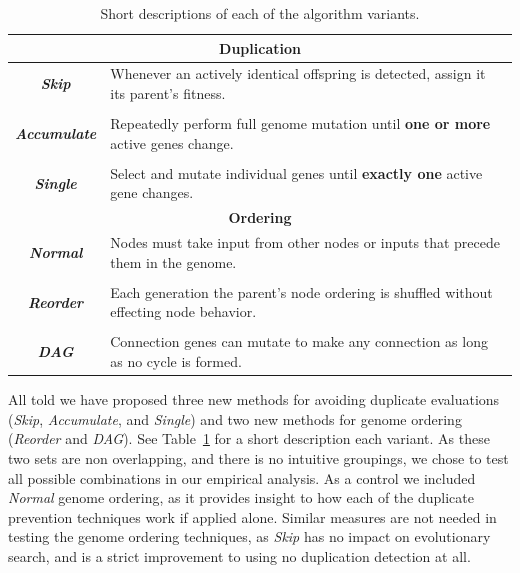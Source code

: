 \documentclass[journal]{IEEEtran}
\begin{document}
\begin{table}
	\centering
	\begin{tabular}{|c|p{6cm}|}
	\hline
  \multicolumn{2}{|c|}{\textbf{Duplication}} \\ \hline
	\textbf{\emph{Skip}} & Whenever an actively identical offspring is detected, assign it its parent's fitness. \\ & \\
	\textbf{\emph{Accumulate}} & Repeatedly perform full genome mutation until \textbf{one or more} active genes change. \\ & \\
	\textbf{\emph{Single}} & Select and mutate individual genes until \textbf{exactly one} active gene changes. \\
	\hline \multicolumn{2}{|c|}{\textbf{Ordering}} \\ \hline
	\textbf{\emph{Normal}} & Nodes must take input from other nodes or inputs that precede them in the genome. \\ & \\
	\textbf{\emph{Reorder}} & Each generation the parent's node ordering is shuffled without effecting node behavior. \\ & \\
	\textbf{\emph{DAG}} & Connection genes can mutate to make any connection as long as no cycle is formed. \\
	  \hline
	\end{tabular}
	\caption{Short descriptions of each of the algorithm variants.}
	\label{tab:glossary}
\end{table}

All told we have proposed three new methods for avoiding duplicate evaluations
(\emph{Skip}, \emph{Accumulate}, and \emph{Single}) and two new methods for
genome ordering (\emph{Reorder} and \emph{DAG}).
See Table~\ref{tab:glossary} for a short description each variant.
As these two
sets are non overlapping, and there is no intuitive groupings, we chose to test
all possible combinations in our empirical analysis.  As a control we included \emph{Normal} genome ordering,
as it provides insight to how each of the duplicate prevention techniques work
if applied alone.  Similar measures are not needed in testing the genome ordering techniques,
as \emph{Skip} has no impact on evolutionary search, and is a strict improvement
to using no duplication detection at all.
\end{document}
